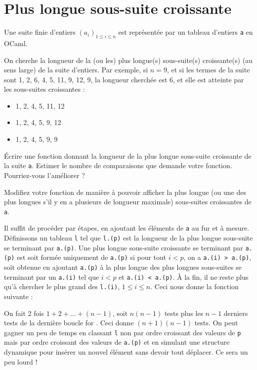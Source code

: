 \renewcommand{\SourceFile}{2-jouer-avec-les-mots/src/2-3.ml}

\section{Plus longue sous-suite croissante}

Une suite finie d'entiers $(a_i)_{1\leq i \leq n}$ est représentée par un tableau d'entiers \texttt{a} en OCaml.
\medskip

On cherche la longueur de la (ou les) plus longue(s) sous-suite(s) croissante(s) (au sens large) de la suite d'entiers. Par exemple, si $n=9$, et si les termes de la suite sont 1, 2, 6, 4, 5, 11, 9, 12, 9, la longueur cherchée est 6, et elle est atteinte par les sous-suites croissantes :
\begin{itemize}
    \item 1, 2, 4, 5, 11, 12
    \item 1, 2, 4, 5, 9, 12
    \item 1, 2, 4, 5, 9, 9
\end{itemize}

\Q
Écrire une fonction donnant la longueur de la plus longue sous-suite croissante de la suite \texttt{a}. Estimer le nombre de comparaisons que demande votre fonction. Pourriez-vous l'améliorer ?

\Q
Modifiez votre fonction de manière à pouvoir afficher la plus longue (ou une des plus longues s'il y en a plusieurs de longueur maximale) sous-suites croissantes de \texttt{a}.

\Corrige

\Q
Il suffit de procéder par étapes, en ajoutant les éléments de \texttt{a} au fur et à mesure. Définissons un tableau \texttt{l} tel que \texttt{l.(p)} est la longueur de la plus longue sous-suite se terminant par \texttt{a.(p)}. Une plus longue sous-suite croissante se terminant par \texttt{a.(p)} est soit formée uniquement de \texttt{a.(p)} si pour tout $i < p$, on a \texttt{a.(i) > a.(p)}, soit obtenue en ajoutant \texttt{a.(p)} à la plus longue des plus longues sous-suites se terminant par un \texttt{a.(i)} tel que $i < p$ et \texttt{a.(i) < a.(p)}. À la fin, il ne reste plus qu'à chercher le plus grand des \texttt{l.(i)}, $1 \leq i \leq n$. Ceci nous donne la fonction suivante :



On fait 2 fois $1 + 2 + ... + (n-1)$, soit $n(n-1)$ tests plus les $n-1$ derniers tests de la dernière boucle \og for \fg{}. Ceci donne $(n+1)(n-1)$ tests. On peut gagner un peu de temps en classant \texttt{l} non par ordre croissant des valeurs de \texttt{p} mais par ordre croissant des valeurs de \texttt{a.(p)} et en simulant une structure dynamique pour insérer un nouvel élément sans devoir tout déplacer. Ce sera un peu lourd !

